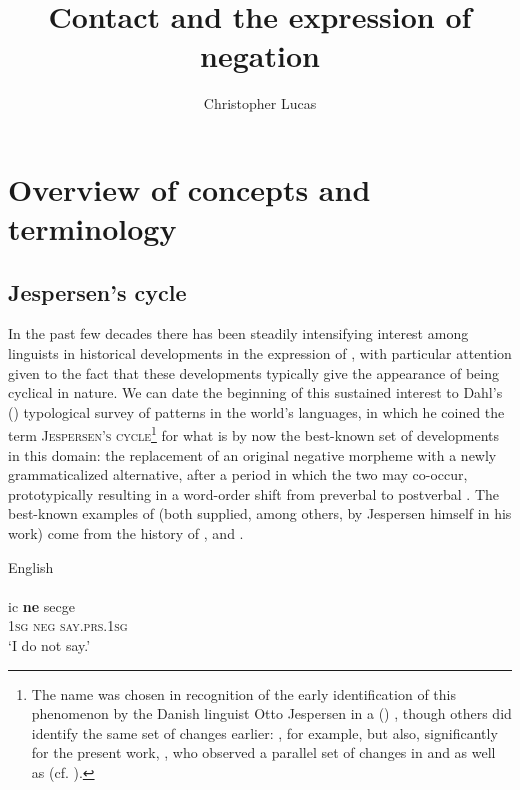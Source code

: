 \documentclass[output=paper]{langsci/langscibook}
\author{Christopher Lucas\affiliation{SOAS University of London}}
\title{Contact and the expression of negation}
\begin{document}
\maketitle





\section{Overview of concepts and terminology}


\subsection{Jespersen’s cycle}


In the past few decades there has been steadily intensifying interest among linguists in historical developments in the expression of , with particular attention given to the fact that these developments typically give the appearance of being cyclical in nature. We can date the beginning of this sustained interest to Dahl's (\citeyear{Dahl1979}) typological survey of  patterns in the world’s languages, in which he coined the term \textsc{Jespersen’s} \textsc{cycle}\footnote{The name was chosen in recognition of the early identification of this phenomenon by the Danish linguist Otto Jespersen in a (\citeyear{Jespersen1917}) , though others did identify the same set of changes earlier: \citet{Meillet1912}, for example, but also, significantly for the present work, \citet{Gardiner1904}, who observed a parallel set of changes in  and  as well as  (cf. \citealt{Auwera2009}).} for what is by now the best-known set of developments in this domain: the replacement of an original negative morpheme with a newly grammaticalized alternative, after a period in which the two may co-occur, prototypically resulting in a word-order shift from preverbal to postverbal . The best-known examples of  (both supplied, among others, by Jespersen himself in his \citeyear{Jespersen1917} work) come from the history of  , and  .

\ea\label{eng}
{{English} \citep[9]{Jespersen1917}}\\
\\
\gll ic \textbf{ne} secge\\
     \textsc{1sg}  \textsc{neg} \textsc{\textup{say}}.\textsc{prs.1sg}  \\
\glt ‘I do not say.’
\end{document}

